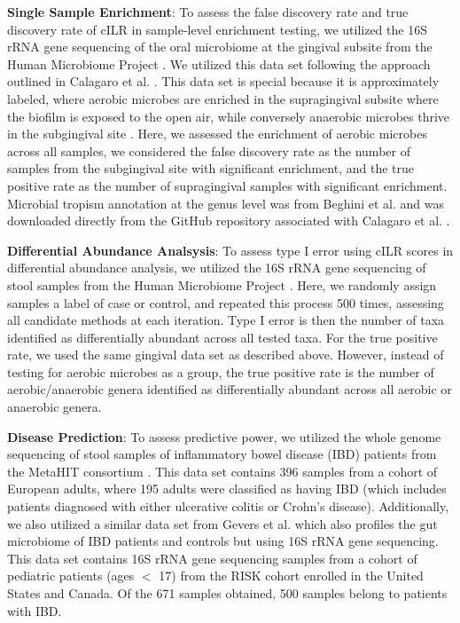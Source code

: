 \documentclass{article}
\begin{document}
\noindent \textbf{Single Sample Enrichment}: To assess the false discovery rate and true discovery rate of cILR in sample-level enrichment testing, we utilized the 16S rRNA gene sequencing of the oral microbiome at the gingival subsite from the Human Microbiome Project \cite{consortium2012, proctor2019}. We utilized this data set following the approach outlined in Calagaro et al. \cite{calgaro2020}. This data set is special because it is approximately labeled, where aerobic microbes are enriched in the supragingival subsite where the biofilm is exposed to the open air, while conversely anaerobic microbes thrive in the subgingival site \cite{thurnheer2016}. Here, we assessed the enrichment of aerobic microbes across all samples, we considered the false discovery rate as the number of samples from the subgingival site with significant enrichment, and the true positive rate as the number of supragingival samples with significant enrichment. Microbial tropism annotation at the genus level was from Beghini et al. \cite{beghini2019} and was downloaded directly from the GitHub repository associated with Calagaro et al. \cite{matteocalgaro2020}. 

\noindent \textbf{Differential Abundance Analsysis}: To assess type I error using cILR scores in differential abundance analysis, we utilized the 16S rRNA gene sequencing of stool samples from the Human Microbiome Project \cite{consortium2012, proctor2019}. Here, we randomly assign samples a label of case or control, and repeated this process 500 times, assessing all candidate methods at each iteration. Type I error is then the number of taxa identified as differentially abundant across all tested taxa. For the true positive rate, we used the same gingival data set as described above. However, instead of testing for aerobic microbes as a group, the true positive rate is the number of aerobic/anaerobic genera identified as differentially abundant across all aerobic or anaerobic genera. 

\noindent \textbf{Disease Prediction}: To assess predictive power, we utilized the whole genome sequencing of stool samples of inflammatory bowel disease (IBD) patients from the MetaHIT consortium \cite{nielsen2014}. This data set contains 396 samples from a cohort of European adults, where 195 adults were classified as having IBD (which includes patients diagnosed with either ulcerative colitis or Crohn's disease). Additionally, we also utilized a similar data set from Gevers et al. \cite{gevers2014} which also profiles the gut microbiome of IBD patients and controls but using 16S rRNA gene sequencing. This data set contains 16S rRNA gene sequencing samples from a cohort of pediatric patients (ages $<$ 17) from the RISK cohort enrolled in the United States and Canada. Of the 671 samples obtained, 500 samples belong to patients with IBD. 
\end{document}

